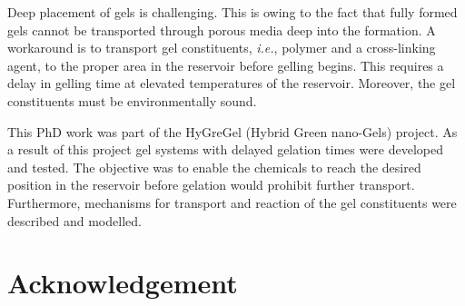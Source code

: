 Deep placement of gels is challenging. This is owing to the fact that fully formed gels cannot be transported through porous media deep into the formation. A workaround is to transport gel constituents, \textit{i.e.}, polymer and a cross-linking agent, to the proper area in the reservoir before gelling begins. This requires a delay in gelling time at elevated temperatures of the reservoir. Moreover, the gel constituents must be environmentally sound.

This PhD work was part of the HyGreGel (Hybrid Green nano-Gels) project. As a result of this project gel systems with delayed gelation times were developed and tested. The objective was to enable the chemicals to reach the desired position in the reservoir before gelation would prohibit further transport. Furthermore, mechanisms for transport and reaction of the gel constituents were described and modelled. 


\clearpage{\thispagestyle{empty}\cleardoublepage}
\chapter*{Acknowledgement}
{\par}


\clearpage{\thispagestyle{empty}\cleardoublepage}
\tableofcontents
\clearpage{\thispagestyle{empty}\cleardoublepage}
\listoffigures
\clearpage{\thispagestyle{empty}\cleardoublepage}
\listoftables

\clearpage{\thispagestyle{empty}\cleardoublepage}

\printnomenclature

